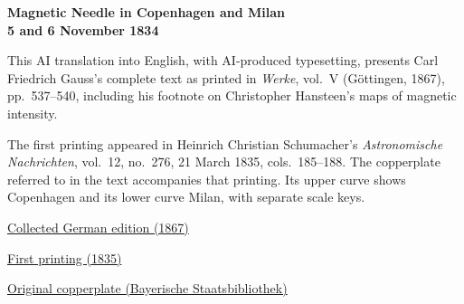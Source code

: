 \clearpage
\thispagestyle{empty}
\begin{center}\Large\textbf{Magnetic Needle in Copenhagen and Milan\\5 and 6 November 1834}\end{center}

This AI translation into English, with AI-produced typesetting, presents Carl Friedrich Gauss’s complete text as printed in \textit{Werke}, vol.~V (Göttingen, 1867), pp.~537--540, including his footnote on Christopher Hansteen’s maps of magnetic intensity.

The first printing appeared in Heinrich Christian Schumacher’s \textit{Astronomische Nachrichten}, vol.~12, no.~276, 21 March 1835, cols.~185--188. The copperplate referred to in the text accompanies that printing. Its upper curve shows Copenhagen and its lower curve Milan, with separate scale keys.

\medskip\noindent
\href{https://gdz.sub.uni-goettingen.de/id/PPN236006339}{Collected German edition (1867)}\par
\noindent\href{https://www.digitale-sammlungen.de/view/bsb10049437?page=103}{First printing (1835)}\par
\noindent\href{https://www.digitale-sammlungen.de/view/bsb10049437?page=231}{Original copperplate (Bayerische Staatsbibliothek)}
\clearpage

